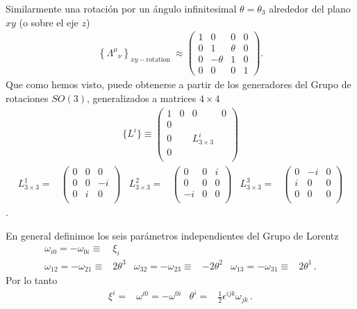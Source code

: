 \begin{frame}
  Similarmente una rotación por un ángulo infinitesimal $\theta=\theta_3$ alrededor del plano $xy$ (o sobre el eje $z$)
\begin{align}
  \left\{{\Lambda^\mu}_{\nu}\right\}_{xy-\text{rotation }}\approx
  \begin{pmatrix}
    1&0&0&0\\
    0&1&\theta&0\\
    0&-\theta&1&0\\
    0&0&0&1
  \end{pmatrix}.
\end{align}
Que como hemos visto, puede obtenerse a partir de los generadores del Grupo de rotaciones $SO(3)$, generalizados a matrices $4\times4$
\begin{align}
  \{L^{i}\}\equiv
  \begin{pmatrix}
    1 & 0 & 0& 0\\
    0 &   &  &  \\
    0 &   & L^i_{3\times3}  &  \\
    0 &   &  &  \\
  \end{pmatrix}
\end{align}
\begin{align*}
  L^1_{3\times3}=&
  \begin{pmatrix}
   0 & 0 & 0\\
   0 & 0 & -i\\
   0 & i & 0 \\
  \end{pmatrix}&
 L^2_{3\times3}=&
 \begin{pmatrix}
  0 & 0  & i \\ 
  0 & 0  & 0 \\
 -i & 0  & 0 \\
 \end{pmatrix}&
 L^3_{3\times3}=&
 \begin{pmatrix}
   0 & -i & 0\\
   i & 0  & 0\\
   0 & 0 & 0\\
 \end{pmatrix}
\end{align*}.


\end{frame}
En general definimos los seis parámetros independientes del Grupo de Lorentz
\begin{align}
  \omega_{i0}=-\omega_{0i}\equiv&\xi_{i} \nonumber\\
  \omega_{12}=-\omega_{21}\equiv&2\theta^3 &   \omega_{32}=-\omega_{23}\equiv&-2\theta^2 &   \omega_{13}=-\omega_{31}\equiv&2\theta^1\,.
\end{align}
Por lo tanto
\begin{align}
\xi^i=&\omega^{i0}=-\omega^{0i}&\theta^i=&\frac{1}{2}\epsilon^{ijk}\omega_{jk}\,.  
\end{align}

